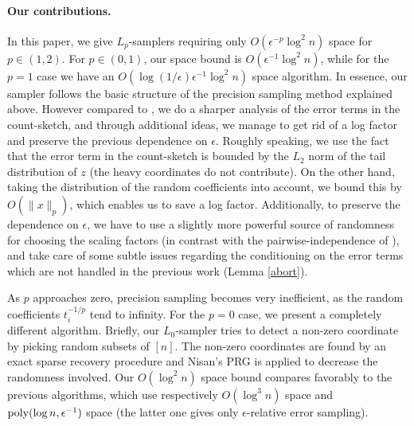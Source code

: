    \paragraph{Our contributions.} In %
   this paper,  we  give $L_p$-samplers requiring only
$O(\epsilon^{-p}\log^2n)$ space for $p \in (1,2)$. For $p \in (0,1)$,
our space bound is  $O(\epsilon^{-1}\log^2n)$, while for the $p=1$ case we have
an $O(\log(1/\epsilon)\epsilon^{-1}\log^2n)$ space algorithm.
    In essence, our sampler follows the basic structure of the
     precision sampling method explained above. %
      However compared to \cite{AndoniKO10}, we
      do a sharper analysis of the error terms in the count-sketch, and through
    additional ideas, we manage to get rid of a log factor
      and preserve the previous dependence on $\epsilon$. 
      Roughly speaking, we use the fact that 
      the error term in the count-sketch is bounded by the $L_2$ 
      norm of the tail distribution of $z$ (the heavy coordinates do not contribute). On
      the other hand, taking 
     the distribution of the random coefficients into account, we
     bound this by $O(\|x\|_p)$, which enables us to save a 
     log factor. Additionally, to preserve
      the dependence on $\epsilon$, we have to use a slightly more 
     powerful source of randomness for choosing the scaling factors
     (in contrast with the pairwise-independence of \cite{AndoniKO10}), and 
     take care of some subtle issues regarding the conditioning on
       the error terms which are not handled in the previous work 
       (Lemma \ref{abort}).
  
     
   As $p$ approaches zero, precision sampling becomes very inefficient, as
  the random coefficients $t_i^{-1/p}$ tend to infinity. For the $p=0$ case,
 we present a completely different algorithm. 
   Briefly, our $L_0$-sampler tries to 
   detect a non-zero
   coordinate by picking random subsets of $[n]$.
   The non-zero coordinates are found
   by an exact sparse recovery procedure and Nisan's PRG \cite{Nisan} 
   is applied to decrease the randomness involved.
   Our $O(\log^2 n)$ space bound compares favorably to the previous algorithms, 
   which use respectively $O(\log^3 n)$ space \cite{FrahlingIS05} 
   and $\operatorname{poly}(\log n,\epsilon^{-1})$  space \cite{MonemizadehW10} 
   (the latter one gives only $\epsilon$-relative error sampling).

